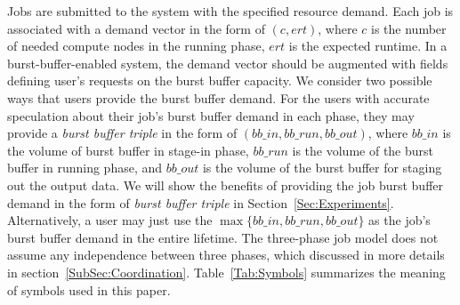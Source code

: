 Jobs are submitted to the system with the specified resource demand.
Each job is associated with a demand vector in the form of $(c, ert)$,
where $c$ is the number of needed compute nodes in the running phase,
$ert$ is the expected runtime.
In a burst-buffer-enabled system, the demand vector should be augmented
with fields defining user's requests on the burst buffer capacity.
We consider two possible ways that users provide the burst buffer demand.
For the users with accurate speculation about their job's burst buffer demand in each phase,
they may provide a \textit{burst buffer triple} in the form of $(bb\_in, bb\_run, bb\_out)$,
where $bb\_in$ is the volume of burst buffer in stage-in phase,
$bb\_run$ is the volume of the burst buffer in running phase, and
$bb\_out$ is the volume of the burst buffer for staging out the output data.
We will show the benefits of providing the job burst buffer demand in the form of \textit{burst buffer triple} in Section~\ref{Sec:Experiments}.
Alternatively, a user may just use the $\max\{bb\_in, bb\_run, bb\_out\}$
as the job's burst buffer demand in the entire lifetime.
The three-phase job model does not assume any independence between three phases, which
discussed in more details in section~\ref{SubSec:Coordination}.
Table~\ref{Tab:Symbols} summarizes the meaning of symbols used in this paper.




